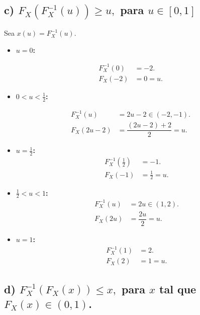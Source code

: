 \documentclass[10pt,a4paper]{article}
\let\leq\leqslant
\let\geq\geqslant
\providecommand{\tightlist}{%
      \setlength{\itemsep}{0pt}\setlength{\parskip}{0pt}}
\begin{document}
    \hypertarget{c-f_xf-1_xu-geq-u-para-u-in-01}{%
\subsection{\texorpdfstring{c) \(F_{X}(F^{-1}_X(u)) \geq u,\) para
\(u \in [0,1]\)}{c) F\_\{X\}(F\^{}\{-1\}\_X(u)) \textbackslash geq u, para u \textbackslash in {[}0,1{]}}}\label{c-f_xf-1_xu-geq-u-para-u-in-01}}

    Sea \(x(u)=F_X^{-1}(u)\).

\begin{itemize}
\tightlist
\item
  \textbf{\(u=0\):}
\end{itemize}

\[
\begin{align*}
F_X^{-1}(0)&=-2. \\
F_X(-2)&=0=u.
\end{align*}
\]

\begin{itemize}
\tightlist
\item
  \textbf{\(0<u<\tfrac12\):}
\end{itemize}

\[
\begin{align*}
F_X^{-1}(u) & =2u-2\in(-2,-1). \\
F_X(2u-2) & =\dfrac{(2u-2)+2}{2}=u.
\end{align*}
\]

\begin{itemize}
\item
  \textbf{\(u=\tfrac12\):} \[
  \begin{align*}
  F_X^{-1}(\tfrac12) & =-1. \\
  F_X(-1) & =\tfrac12=u.
  \end{align*}
  \]
\item
  \textbf{\(\tfrac12<u<1\):} \[
  \begin{align*}
  F_X^{-1}(u) & =2u\in(1,2). \\
  F_X(2u) & =\dfrac{2u}{2}=u.
  \end{align*}
  \]
\item
  \textbf{\(u=1\):} \[
  \begin{align*}
  F_X^{-1}(1) & =2. \\
  F_X(2) & =1=u.
  \end{align*}
  \]
\end{itemize}

    \hypertarget{d-f_x-1f_xx-leq-x-para-x-tal-que-f_xx-in-0-1.}{%
\subsection{\texorpdfstring{d) \(F_{X}^{-1}(F_X(x)) \leq x,\) para \(x\)
tal que
\(F_X(x) \in (0, 1)\).}{d) F\_\{X\}\^{}\{-1\}(F\_X(x)) \textbackslash leq x, para x tal que F\_X(x) \textbackslash in (0, 1).}}\label{d-f_x-1f_xx-leq-x-para-x-tal-que-f_xx-in-0-1.}}
\end{document}
